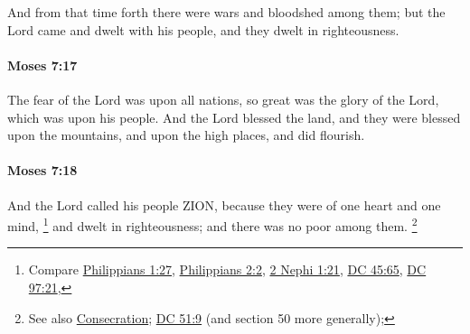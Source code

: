 			And from that time forth there were wars and bloodshed among them; but the Lord came and dwelt with his people, and they dwelt in righteousness.


		\paragraph{Moses 7:17} %
			\label{MOSES-7-17}

			The fear of the Lord was upon all nations, so great was the glory of the Lord, which was upon his people. And the Lord blessed the land, and they were blessed upon the mountains, and upon the high places, and did flourish.


		\paragraph{Moses 7:18} %
			\label{MOSES-7-18}

			And the Lord called his people ZION, because they were of one heart and one mind,%
				\footnote{%
					Compare \hyperref[PHILIPPIANS-1-27]{Philippians 1:27}, \hyperref[PHILIPPIANS-2-2]{Philippians 2:2}, \hyperref[2NEPHI-1-21]{2 Nephi 1:21}, \hyperref[DC45-65]{DC 45:65}, \hyperref[DC97-21]{DC 97:21}, 
					}
			and dwelt in righteousness; and there was no poor among them.%
				\footnote{%
					See also \hyperref[CONSECRATION]{Consecration}; \hyperref[DC51-9]{DC 51:9} (and section 50 more generally); 
					}


